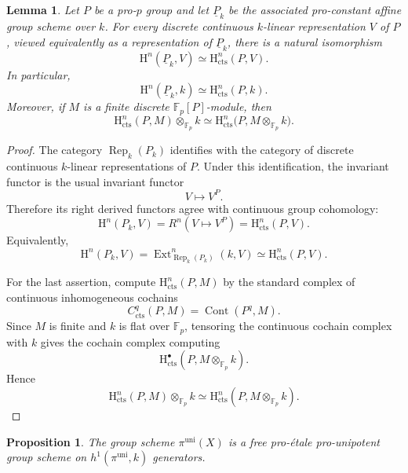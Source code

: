 \documentclass[12pt,a4]{amsart}
\newtheorem{lem}[claim]{Lemma}
\newtheorem{prop}[claim]{Proposition}
\theoremstyle{definition}
\begin{document}
\begin{lem}\label{lem:cohomology-comparison-proconstant}
	Let \(P\) be a pro-\(p\) group and let
	\(\underline{P}_k\) be the associated pro-constant affine group scheme over
	\(k\). For every discrete continuous \(k\)-linear representation \(V\) of
	\(P\), viewed equivalently as a representation of \(\underline{P}_k\), there is
	a natural isomorphism
	\[
	\mathrm H^n(\underline{P}_k,V)
	\simeq
	\mathrm H^n_{\mathrm{cts}}(P,V).
	\]
	In particular,
	\[
	\mathrm H^n(\underline{P}_k,k)
	\simeq
 \mathrm H^n_{\mathrm{cts}}(P,k).
	\]
	Moreover, if \(M\) is a finite discrete \(\mathbb F_p[P]\)-module, then
	\[
	\mathrm H^n_{\mathrm{cts}}(P,M)\otimes_{\mathbb F_p}k
	\simeq
	\mathrm H^n_{\mathrm{cts}}\bigl(P,M\otimes_{\mathbb F_p}k\bigr).
	\]
\end{lem}

\begin{proof}
	The category \(\operatorname{Rep}_k(P_k)\) identifies with the category of
	discrete continuous \(k\)-linear representations of \(P\). Under this
	identification, the invariant functor is the usual invariant functor
	\[
	V\longmapsto V^P .
	\]
	Therefore its right derived functors agree with continuous group cohomology:
	\[
	\mathrm H^n(P_k,V)=R^n(V\mapsto V^P)= \mathrm H^n_{\mathrm{cts}}(P,V).
	\]
	Equivalently,
	\[
	\mathrm H^n(P_k,V)
	=
	\operatorname{Ext}^n_{\operatorname{Rep}_k(P_k)}(k,V)
	\simeq
	\mathrm H^n_{\mathrm{cts}}(P,V).
	\]
	
	For the last assertion, compute \(\mathrm H^n_{\mathrm{cts}}(P,M)\) by the standard
	complex of continuous inhomogeneous cochains
	\[
	C^q_{\mathrm{cts}}(P,M)=\operatorname{Cont}(P^q,M).
	\]
	Since \(M\) is finite and \(k\) is flat over \(\mathbb F_p\), tensoring the
	continuous cochain complex with \(k\) gives the cochain complex computing
	\[
	\mathrm H^\bullet_{\mathrm{cts}}(P,M\otimes_{\mathbb F_p}k).
	\]
	Hence
	\[
	\mathrm H^n_{\mathrm{cts}}(P,M)\otimes_{\mathbb F_p}k
	\simeq
	\mathrm H^n_{\mathrm{cts}}(P,M\otimes_{\mathbb F_p}k).
	\]
\end{proof}

\begin{prop}\label{thm:pi-uni-free}
	The group scheme \(\pi^{\mathrm{uni}}(X)\) is a free pro-\'etale
	pro-unipotent group scheme on
	$
	h^1(\pi^{\mathrm{uni}},k)
	$
	generators.
\end{prop}
\end{document}
